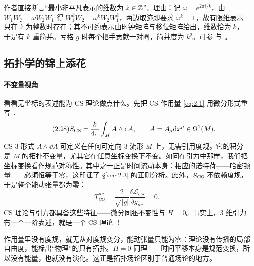 \begin{yizhu}[含糊点]
作者直接断言“最小非平凡表示的维数为 $k\in\mathbb{Z}$”。理由：记 $\omega = e^{2\pi i/k}$，由 $W_1W_2 = \omega W_2W_1$ 得 $W_1^kW_2 = \omega^kW_2W_1^k$，两边取迹即要求 $\omega^k = 1$，故有限维表示只在 $k$ 为整数时存在；其不可约表示由时钟矩阵与移位矩阵给出，维数恰为 $k$，于是有 $k$ 重简并。亏格 $g$ 时每个把手贡献一对圈，简并度为 $k^g$。可参 \cite{witten1989} 与 \cite{verlinde1988}。
\end{yizhu}


\subsection{拓扑学的锦上添花}\label{sec:2.4}

\paragraph{不变量视角}看看无坐标的表述能为 CS 理论做点什么。先把 CS 作用量 \eqref{eq:2.1} 用微分形式重写：
\begin{equation}\tag{2.28}\label{eq:2.28}
  S_{\mathrm{CS}} = \frac{k}{4\pi}\int_M A\wedge\mathrm{d} A, \qquad A = A_\mu\mathrm{d} x^\mu \in \Omega^1(M).
\end{equation}
CS 3-形式 $A\wedge\dd A$ 可定义在任何可定向 3-流形 $M$ 上，无需引用度规。它的积分是 $M$ 的拓扑不变量，尤其它在任意坐标变换下不变。如同在引力中那样，我们把坐标变换看作规范对称性。其中之一正是时间流动本身：相应的诺特荷——哈密顿量——必须恒等于零，这印证了 \S\ref{sec:2.3} 的正则分析。此外，$S_{\mathrm{CS}}$ 不依赖度规，于是整个能动张量都为零：
\begin{equation}\tag{2.29}\label{eq:2.29}
  T^{\mu\nu}_{\mathrm{CS}} = \frac{2}{\sqrt{|g|}}\frac{\delta\mathcal{L}_{\mathrm{CS}}}{\delta g_{\mu\nu}} = 0.
\end{equation}
CS 理论与引力都具备这些特征——微分同胚不变性与 $H = 0$。事实上，3 维引力有一个一阶表述，就是一个 CS 理论 \cite{achucarro1986}！

\begin{yizhu}[物理图像]
作用量里没有度规，就无从对度规变分，能动张量只能为零：理论没有传播的局部自由度，能标出“物理”的只有拓扑。$H = 0$ 同理——时间平移本身是规范变换，所以没有能量，也就没有演化。这正是拓扑场论区别于普通场论的地方。
\end{yizhu}

